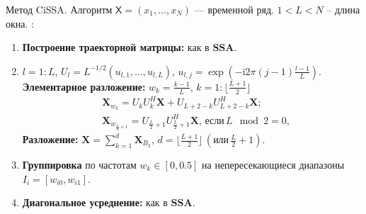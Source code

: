 \documentclass[notheorems, handout]{beamer}
\newcommand{\SSA}{\textbf{SSA}}
\newcommand{\TS}{\mathsf{X}}
\begin{document}
	\begin{frame}{Метод CiSSA. Алгоритм}
		\( \TS = (x_1, \ldots, x_N) \) — временной ряд.  \( 1 < L < N \) --  длина окна.
		\textbf{\structure{Алгоритм $\SSA$}}:
		\begin{enumerate}
			\item \textbf{Построение траекторной матрицы:} как в $\SSA$.
			
			\item $l = 1:L$, ${U}_{l}=L^{-1/2}(u_{l,1},\dots,u_{l,L}), \, u_{l,j}=\exp\left(-\mathrm{i}2\pi(j-1)\frac{l-1}{L}\right).$
			\textbf{Элементарное разложение:} $w_k = \frac{k-1}{L}$, $k = 1:\lfloor \frac{L+1}{2} \rfloor$
			\begin{align*}
				&\mathbf X_{w_k}  = U_k U_k^H \mathbf X + U_{L+2-k} U_{L+2-k}^H \mathbf X;\\
				&\mathbf X_{w_{\frac{L}{2} + 1}}  = 
				U_{\frac{L}{2} + 1} U_{\frac{L}{2} + 1}^H \mathbf X, \, \text{если} \, L \mod 2 = 0,
			\end{align*}
			\textbf{Разложение:}
			$
			\mathbf{X} = \sum\limits_{k=1}^d \mathbf{X}_{B_k}, \, d = \lfloor \frac{L+1}{2} \rfloor \, (\text{или} \, \frac{L}{2} + 1).
			$

			\item \textbf{Группировка} по частотам $w_k \in [0, 0.5]$ на непересекающиеся диапазоны $I_i = [w_{i0}, w_{i1}]$.

			\item \textbf{Диагональное усреднение:} как в $\SSA$.
		\end{enumerate}

	
	\end{frame}
\end{document}
